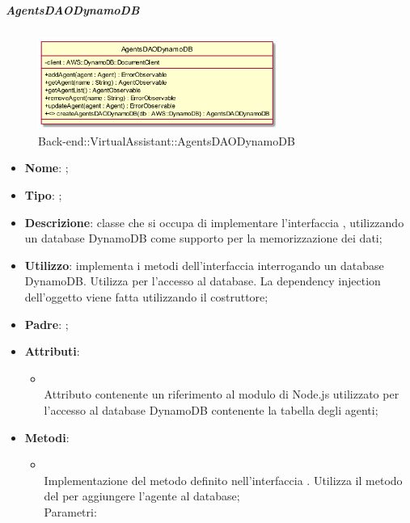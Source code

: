 \hypertarget{AgentsDAODynamoDB_label}{\subparagraph{AgentsDAODynamoDB}}
\begin{figure}[h]
	\centering
	\includegraphics[width=0.70\textwidth,height=\textheight,keepaspectratio]{images/ClassAgentsDAODynamoDB.png}
	\caption{Back-end::VirtualAssistant::AgentsDAODynamoDB}
\end{figure}
\begin{itemize}
	\item \textbf{Nome}: ;
	\item \textbf{Tipo}: ;
	\item \textbf{Descrizione}: classe che si occupa di implementare l'interfaccia , utilizzando un database DynamoDB come supporto per la memorizzazione dei dati;
	\item \textbf{Utilizzo}: implementa i metodi dell'interfaccia  interrogando un database DynamoDB. Utilizza  per l'accesso al database. La dependency injection dell'oggetto  viene fatta utilizzando il costruttore;
	\item \textbf{Padre}: ;
	\item \textbf{Attributi}:
	\begin{itemize}
		\item[]  \\
		Attributo contenente un riferimento al modulo di Node.js utilizzato per l'accesso al database DynamoDB contenente la tabella degli agenti;
	\end{itemize}
	\item \textbf{Metodi}:
	\begin{itemize}
		\item[]  \\		Implementazione del metodo definito nell'interfaccia . Utilizza il metodo  del  per aggiungere l'agente al database;\\
		Parametri:
		\begin{itemize}

\end{itemize}
\end{itemize}
\end{itemize}
